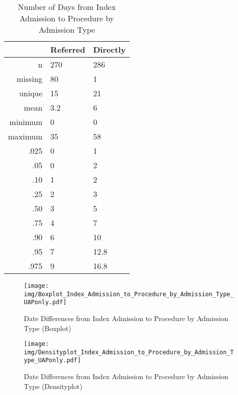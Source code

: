 \documentclass[a4paper]{report}
\begin{document}
\begin{itemize}
{%
\begin{table}[ht]
\centering
\begin{tabular}{rll}
  \toprule
 & Referred & Directly \\ 
  \midrule
n & 270 & 286 \\ 
  missing & 80 & 1 \\ 
  unique & 15 & 21 \\ 
  mean & 3.2 & 6 \\ 
  minimum & 0 & 0 \\ 
  maximum & 35 & 58 \\ 
  .025 & 0 & 1 \\ 
  .05 & 0 & 2 \\ 
  .10 & 1 & 2 \\ 
  .25 & 2 & 3 \\ 
  .50 & 3 & 5 \\ 
  .75 & 4 & 7 \\ 
  .90 & 6 & 10 \\ 
  .95 & 7 & 12.8 \\ 
  .975 & 9 & 16.8 \\ 
   \bottomrule
\end{tabular}
\caption{Number of Days from Index Admission to Procedure by Admission Type} 
\end{table}
\begin{figure}
  \centering
  \caption{Date Differences from Index Admission to Procedure by Admission Type (Boxplot)}
  \label{Boxplot: Date Differences from Index Admission to Procedure by Admission Type}
\texttt{[image: img/Boxplot\_Index\_Admission\_to\_Procedure\_by\_Admission\_Type\_UAPonly.pdf]}\end{figure}


\begin{figure}
  \centering
  \caption{Date Differences from Index Admission to Procedure by Admission Type (Densityplot)}
  \label{Density: Date Differences from Index Admission to Procedure by Admission Type}
\texttt{[image: img/Densityplot\_Index\_Admission\_to\_Procedure\_by\_Admission\_Type\_UAPonly.pdf]}\end{figure}



\clearpage

}
\end{itemize}
\end{document}
